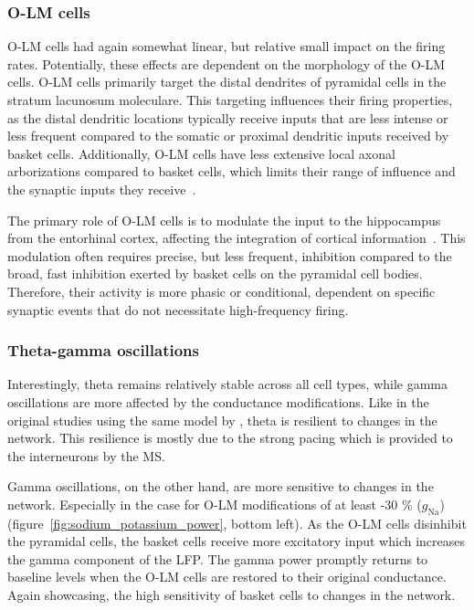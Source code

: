 \subsubsection{O-LM cells}
O-LM cells had again somewhat linear, but relative small impact on the firing rates.
Potentially, these effects are dependent on the morphology of the O-LM cells.
O-LM cells primarily target the distal dendrites of pyramidal cells in the stratum lacunosum moleculare. 
This targeting influences their firing properties, as the distal dendritic locations typically receive inputs that are less intense or 
less frequent compared to the somatic or proximal dendritic inputs received by basket cells. Additionally, O-LM cells have less extensive 
local axonal arborizations compared to basket cells, which limits their range of influence and the synaptic inputs they receive~\parencite{saragaActiveDendritesSpike2003}.

The primary role of O-LM cells is to modulate the input to the hippocampus from the entorhinal cortex, 
affecting the integration of cortical information~\parencite{leaoOLMInterneuronsDifferentially2012}. This modulation often requires precise, 
but less frequent, inhibition compared to the broad, fast inhibition exerted by basket cells on the pyramidal cell bodies. 
Therefore, their activity is more phasic or conditional, dependent on specific synaptic events that do not necessitate high-frequency firing.

\subsubsection{Theta-gamma oscillations}
Interestingly, theta remains relatively stable across all cell types, while gamma oscillations are more affected by the conductance modifications.
Like in the original studies using the same model by \textcite{sanjayImpairedDendriticInhibition2015,neymotinKetamineDisruptsTheta2011}, 
theta is resilient to changes in the network. This resilience is mostly due to the strong pacing which is provided to the interneurons by the MS\@.

Gamma oscillations, on the other hand, are more sensitive to changes in the network. Especially in the case for O-LM modifications of at least -30 \% (\(g_{\text{Na}}\))
(figure~\ref{fig:sodium_potassium_power}, bottom left). As the O-LM cells disinhibit the pyramidal cells, the basket cells receive more excitatory input which 
increases the gamma component of the LFP\@. The gamma power promptly returns to baseline levels when the O-LM cells are restored to their original conductance.
Again showcasing, the high sensitivity of basket cells to changes in the network. 

